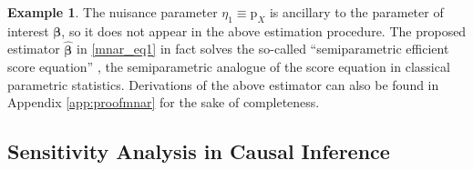 \documentclass{article}
\theoremstyle{plain}
\theoremstyle{definition}
\newtheorem{example}[theorem]{Example}
\theoremstyle{remark}
\def\diff{\mathrm{d}}
\def\bbeta{\boldsymbol{\beta}}
\def\hat{\widehat}
\def\p{\mathrm{p}}
\begin{document}
\begin{example}
The nuisance parameter $\eta_{1} \equiv \p_{X}$ is ancillary to the parameter of interest $\bbeta$, so it does not appear in the above estimation procedure. The proposed estimator $\hat{\bbeta}$ in \eqref{mnar_eq1} in fact solves the so-called ``semiparametric efficient score equation'' \citep{tsiatis2007semiparametric}, the semiparametric analogue of the score equation in classical parametric statistics. Derivations of the above estimator can also be found in Appendix \ref{app:proofmnar} for the sake of completeness.

\label{eg:mnar}
\end{example}

\subsection{Sensitivity Analysis in Causal Inference}
\end{document}
